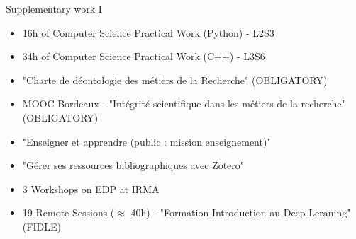 \begin{frame}{Supplementary work I}
	\small
	\vspace{-5pt}
	\begin{tcolorbox}[
		skin=bicolor,
		colback=other, %
		colbacklower=other!20!white,
		title={Temporary employment at the university},
		arc=2mm, %
		boxrule=0.5pt, %
		breakable, enhanced jigsaw,
		width=\linewidth,
		opacityback=0.1,
		]
		\begin{itemize}[\textcolor{other}{$\blacktriangleright$}]
			\item 16h of Computer Science Practical Work (Python) - L2S3
			\item 34h of Computer Science Practical Work (C++) - L3S6
		\end{itemize}
	\end{tcolorbox}

	\begin{tcolorbox}[
		skin=bicolor,
		colback=other, %
		colbacklower=other!20!white,
		title={Formations},
		arc=2mm, %
		boxrule=0.5pt, %
		breakable, enhanced jigsaw,
		width=\linewidth,
		opacityback=0.1
		]
		
		\begin{itemize}[\textcolor{other}{$\blacktriangleright$}]
			\item "Charte de déontologie des métiers de la Recherche" (OBLIGATORY)
			\item MOOC Bordeaux - "Intégrité scientifique dans les métiers de la recherche" (OBLIGATORY)
			\item "Enseigner et apprendre (public : mission enseignement)"
			\item "Gérer ses ressources bibliographiques avec Zotero"
			\item 3 Workshops on EDP at IRMA
			\item 19 Remote Sessions ($\approx$ 40h) - "Formation Introduction au Deep Leraning" (FIDLE)
		\end{itemize}
	\end{tcolorbox}
\end{frame}


